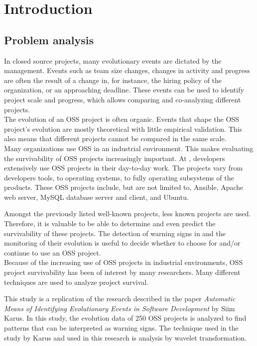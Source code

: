 \chapter{Introduction}

\section{Problem analysis}

In closed source projects, many evolutionary events are dictated by the
management.
Events such as team size changes, changes in activity and progress are often the
result of a change in, for instance, the hiring policy of the organization, or
an approaching deadline. These events can be used to identify project scale and
progress, which allows comparing and co-analyzing different projects.\\

The evolution of an OSS project is often organic. Events that shape the
OSS project's evolution are mostly theoretical with little empirical validation.
This also means that different projects cannot be compared in the same scale.\\

Many organizations use OSS in an industrial environment. This makes evaluating
the survivability of OSS projects increasingly important. At \theOrganization,
developers extensively use OSS projects in their day-to-day work. The projects
vary from developers tools, to operating systems, to fully operating subsystems
of the products. These OSS projects include, but are not limited to, Ansible,
Apache web server, MySQL database server and client, and Ubuntu.

Amongst the previously listed well-known projects, less known projects are used.
Therefore, it is valuable to be able to determine and even predict the
survivability of these projects. The detection of warning signs in and the
monitoring of their evolution is useful to decide whether to choose for and/or
continue to use an OSS project.\\

Because of the increasing use of OSS projects in industrial environments, OSS
project survivability has been of interest by many researchers. Many different
techniques are used to analyze project survival.

This study is a replication of the research described in the paper
\emph{Automatic Means of Identifying Evolutionary Events in Software
Development} by Siim Karus. In this study, the evolution data of 250 OSS
projects is analyzed to find patterns that can be interpreted as warning
signs. The technique used in the study by Karus and used in this research is
analysis by wavelet transformation.

